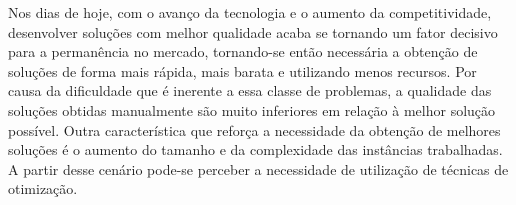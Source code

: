 
  
Nos dias de hoje, com o avanço da tecnologia e o aumento da competitividade,
desenvolver soluções com melhor qualidade acaba se tornando um fator decisivo
para a permanência no mercado, tornando-se então necessária a obtenção de
soluções de forma mais rápida, mais barata e utilizando menos recursos. Por
causa da dificuldade que é inerente a essa classe de problemas, a qualidade das
soluções obtidas manualmente são muito inferiores em relação à melhor solução
possível. Outra característica que reforça a necessidade da obtenção de
melhores soluções é o aumento do tamanho e da complexidade das instâncias
trabalhadas. A partir desse cenário pode-se perceber a necessidade de
utilização de técnicas de otimização.

  



